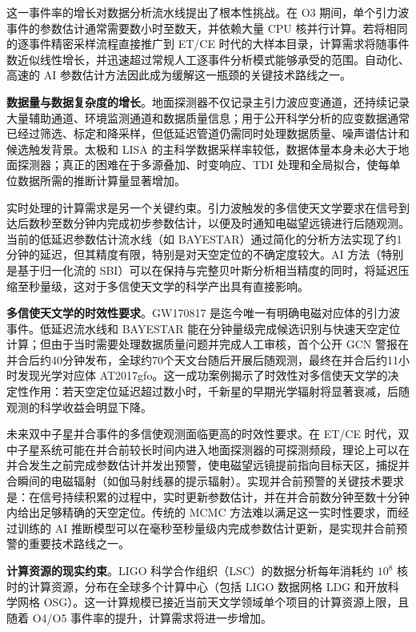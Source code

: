 这一事件率的增长对数据分析流水线提出了根本性挑战。在 O3 期间，单个引力波事件的参数估计通常需要数小时至数天，并依赖大量 CPU 核并行计算。若将相同的逐事件精密采样流程直接推广到 ET/CE 时代的大样本目录，计算需求将随事件数近似线性增长，并迅速超过常规人工逐事件分析模式能够承受的范围。自动化、高速的 AI 参数估计方法因此成为缓解这一瓶颈的关键技术路线之一。

\textbf{数据量与数据复杂度的增长}。地面探测器不仅记录主引力波应变通道，还持续记录大量辅助通道、环境监测通道和数据质量信息；用于公开科学分析的应变数据通常已经过筛选、标定和降采样，但低延迟管道仍需同时处理数据质量、噪声谱估计和候选触发背景。太极和 LISA 的主科学数据采样率较低，数据体量本身未必大于地面探测器；真正的困难在于多源叠加、时变响应、TDI 处理和全局拟合，使每单位数据所需的推断计算量显著增加。

实时处理的计算需求是另一个关键约束。引力波触发的多信使天文学要求在信号到达后数秒至数分钟内完成初步参数估计，以便及时通知电磁望远镜进行后随观测。当前的低延迟参数估计流水线（如 BAYESTAR）通过简化的分析方法实现了约1分钟的延迟，但其精度有限，特别是对天空定位的不确定度较大。AI 方法（特别是基于归一化流的 SBI）可以在保持与完整贝叶斯分析相当精度的同时，将延迟压缩至秒量级，这对于多信使天文学的科学产出具有直接影响。

\textbf{多信使天文学的时效性要求}。GW170817 是迄今唯一有明确电磁对应体的引力波事件。低延迟流水线和 BAYESTAR 能在分钟量级完成候选识别与快速天空定位计算；但由于当时需要处理数据质量问题并完成人工审核，首个公开 GCN 警报在并合后约40分钟发布，全球约70个天文台随后开展后随观测，最终在并合后约11小时发现光学对应体 AT2017gfo。这一成功案例揭示了时效性对多信使天文学的决定性作用：若天空定位延迟超过数小时，千新星的早期光学辐射将显著衰减，后随观测的科学收益会明显下降。

未来双中子星并合事件的多信使观测面临更高的时效性要求。在 ET/CE 时代，双中子星系统可能在并合前较长时间内进入地面探测器的可探测频段，理论上可以在并合发生之前完成参数估计并发出预警，使电磁望远镜提前指向目标天区，捕捉并合瞬间的电磁辐射（如伽马射线暴的提示辐射）。实现并合前预警的关键技术要求是：在信号持续积累的过程中，实时更新参数估计，并在并合前数分钟至数十分钟内给出足够精确的天空定位。传统的 MCMC 方法难以满足这一实时性要求，而经过训练的 AI 推断模型可以在毫秒至秒量级内完成参数估计更新，是实现并合前预警的重要技术路线之一。

\textbf{计算资源的现实约束}。LIGO 科学合作组织（LSC）的数据分析每年消耗约 $10^8$ 核时的计算资源，分布在全球多个计算中心（包括 LIGO 数据网格 LDG 和开放科学网格 OSG）。这一计算规模已接近当前天文学领域单个项目的计算资源上限，且随着 O4/O5 事件率的提升，计算需求将进一步增加。

